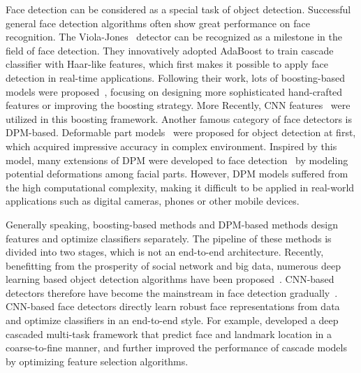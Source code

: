 \documentclass[10pt,twocolumn,letterpaper]{article}
\begin{document}
Face detection can be considered as a special task of object detection. Successful general face detection algorithms often show great performance on face recognition. The Viola-Jones~\cite{viola2001rapid} detector can be recognized as a milestone in the field of face detection. They innovatively adopted AdaBoost to train cascade classifier with Haar-like features, which first makes it possible to apply face detection in real-time applications. Following their work, lots of boosting-based models were proposed~\cite{li2013learning,dollar2014fast,mathias2014face,zhu2016group}, focusing on designing more sophisticated hand-crafted features or improving the boosting strategy. More Recently, CNN features~\cite{yang2015convolutional} were utilized in this boosting framework.
Another famous category of face detectors is DPM-based. Deformable part models~\cite{felzenszwalb2010DPM} were proposed for object detection at first, which acquired impressive accuracy in complex environment. Inspired by this model, many extensions of DPM were developed to face detection~\cite{ghiasi2014occlusion} by modeling potential deformations among facial parts.
However, DPM models suffered from the high computational complexity, making it difficult to be applied in real-world applications such as digital cameras, phones or other mobile devices.

Generally speaking, boosting-based methods and DPM-based methods design features and optimize classifiers separately. The pipeline of these methods is divided into two stages, which is not an end-to-end architecture. Recently, benefitting from the prosperity of social network and big data, numerous deep learning based object detection algorithms have been proposed~\cite{girshick2015fast,ren2015faster,10.1007/978-3-540-74549-5_10,liu:inria-00325656,DBLP:journals/corr/ChenL17d}. CNN-based detectors therefore have become the mainstream in face detection gradually~\cite{farfade2015multi,li2015convolutional}. CNN-based face detectors directly learn robust face representations from data and optimize classifiers in an end-to-end style. For example, \cite{zhang2016joint} developed a deep cascaded multi-task framework that predict face and landmark location in a coarse-to-fine manner, and \cite{yu2016submodular} further improved the performance of cascade models by optimizing feature selection algorithms.
\end{document}
